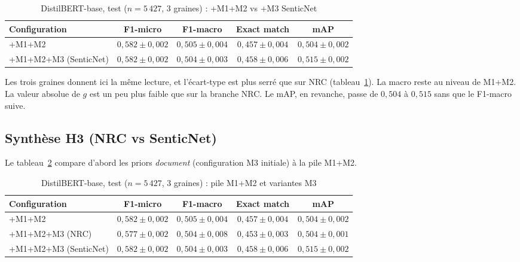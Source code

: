 \begin{table}[H]
\centering
\caption{DistilBERT-base, test ($n{=}5\,427$, 3 graines) : +M1+M2 vs +M3 SenticNet}
\label{tab:expe-m3-senticnet-distilbert}
\renewcommand{\arraystretch}{1.2}
\begin{tabular}{|l|c|c|c|c|}
\hline
\textbf{Configuration} & \textbf{F1-micro} & \textbf{F1-macro} & \textbf{Exact match} & \textbf{mAP} \\
\hline
+M1+M2 & $0{,}582 \pm 0{,}002$ & $0{,}505 \pm 0{,}004$ & $0{,}457 \pm 0{,}004$ & $0{,}504 \pm 0{,}002$ \\
\hline
+M1+M2+M3 (SenticNet) & $0{,}582 \pm 0{,}002$ & $0{,}504 \pm 0{,}003$ & $0{,}458 \pm 0{,}006$ & $0{,}515 \pm 0{,}002$ \\
\hline
\end{tabular}
\end{table}

Les trois graines donnent ici la même lecture, et l'écart-type est plus
serré que sur NRC
(tableau~\ref{tab:expe-m3-senticnet-distilbert}). La macro reste au
niveau de M1+M2. La valeur absolue de $g$ est un peu plus faible que
sur la branche NRC. Le mAP, en revanche, passe de $0{,}504$ à
$0{,}515$ sans que le F1-macro suive.

\subsection{Synthèse H3 (NRC vs SenticNet)}
\label{sec:expe-h3-synthese}

Le tableau~\ref{tab:expe-h3-lexicons} compare d'abord les priors
\emph{document} (configuration M3 initiale) à la pile M1+M2.

\begin{table}[H]
\centering
\caption{DistilBERT-base, test ($n{=}5\,427$, 3 graines) : pile M1+M2 et variantes M3}
\label{tab:expe-h3-lexicons}
\renewcommand{\arraystretch}{1.2}
\begin{tabular}{|l|c|c|c|c|}
\hline
\textbf{Configuration} & \textbf{F1-micro} & \textbf{F1-macro} & \textbf{Exact match} & \textbf{mAP} \\
\hline
+M1+M2 & $0{,}582 \pm 0{,}002$ & $0{,}505 \pm 0{,}004$ & $0{,}457 \pm 0{,}004$ & $0{,}504 \pm 0{,}002$ \\
\hline
+M1+M2+M3 (NRC) & $0{,}577 \pm 0{,}002$ & $0{,}504 \pm 0{,}008$ & $0{,}453 \pm 0{,}003$ & $0{,}504 \pm 0{,}001$ \\
\hline
+M1+M2+M3 (SenticNet) & $0{,}582 \pm 0{,}002$ & $0{,}504 \pm 0{,}003$ & $0{,}458 \pm 0{,}006$ & $0{,}515 \pm 0{,}002$ \\
\hline
\end{tabular}
\end{table}

